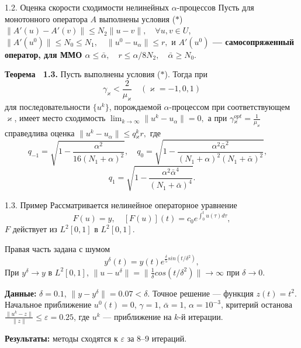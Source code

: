 \documentclass[10pt,pdf, mathserif, hyperref={unicode}]{beamer}
\begin{document}
\begin{frame}{\small 1.2. Оценка скорости сходимости нелинейных $\alpha$-процессов}
		Пусть для монотонного оператора $A$ выполнены условия ($*$) $\|A'(u)-A'(v)\|\leqslant N_2\|u-v\|, \quad \forall u, v \in U$,	$\|A'(u^0)\| \leqslant N_0\leqslant N_1, \quad \|u^0-u_\alpha\| \leqslant r,$ и {\textbf{\color{blue}$A'(u^0)$ --- самосопряженный оператор, для ММО $\alpha \leqslant \bar\alpha, \quad r\leqslant \alpha/8N_2, \quad \bar\alpha \geqslant N_0.$}}
	\begin{block}{\bf Теорема ~1.3.}
		Пусть выполнены условия ($*$). Тогда при
		$$\gamma _\varkappa <\frac{2}{\mu _\varkappa}\quad (\varkappa=-1,0,1)$$
		для последовательности $\{u^k\}$, порождаемой $\alpha$-процессом при соответствующем $\varkappa$, имеет место сходимость $\lim_{k\to\infty}\|u^k-u_\alpha\|=0, $ а при 
		$\gamma{_\varkappa^{opt}}=\frac{1}{\mu_\varkappa}$
		справедлива оценка $\|u^k-u_\alpha\|\leqslant q{_\varkappa^k}r,$ где
		$$
		q_{-1}=\sqrt{1-\frac{\alpha^2}{16(N_1+\alpha)^2}}, \quad q_0=\sqrt{1-\frac{\alpha^2\bar\alpha^2}{(N_1+\alpha)^2(N_1+\bar\alpha)^2}}, \quad $$$$q_1=\sqrt{1-\frac{\alpha^2\bar\alpha^4}{(N_1+\bar\alpha)^4}}.
		$$
	\end{block}
\end{frame}
\begin{frame}{1.3. Пример}
Рассматривается нелинейное операторное уравнение
	$$	F(u)=y, \quad [F(u)](t)=c_0 e^{\int_{0}^{t}u(\tau)d\tau},$$
	$F$ действует из $L^2[0,1]$ в $L^2[0,1]$. 
	
	Правая часть задана с шумом $$y^\delta(t)=y(t)e^{\frac{\delta}{5} sin(t/{\delta}^2)},$$
	При $y^\delta\to y$ в $L^2[0,1]$,  $\|u-u^\delta\|=\|\frac{1}{\delta}cos(t/{\delta}^2)\|\to\infty$ при $\delta\to 0$.
	
	{\textbf{\color{blue}Данные:}} $\delta=0.1$, $\|y-y^{\delta}\|=0.07<\delta$. Точное решение --- функция $z(t)=t^2$. Начальное приближение $u^0(t)=0$, $\gamma=1$, $\bar\alpha=1$, $\alpha=10^{-3}$, критерий останова $\frac{\|u^k-z\|}{\|z\|}\leqslant\varepsilon=0.25$, где $u^k$ --- приближение на $k$-й итерации.
	
	{\textbf{\color{blue}Результаты:}} методы сходятся к $\varepsilon$ за 8--9 итераций.

	\let\thefootnote\relax\let\thefootnote\relax{}
\end{frame}
\end{document}
